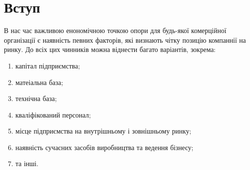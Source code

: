 




\fontsize{14}{14pt}\selectfont

\maketitle


\tableofcontents


%


\section{Вступ}
В нас час важливою енономічною точкою опори для будь-якої комерційної організації є наявність певних факторів, які визнають чітку позицію компаннії на ринку. До всіх цих чинників можна віднести багато варіантів, зокрема:
\begin{enumerate}
\item капітал підприємства;
\item матеіальна база;
\item технічна база;
\item кваліфікований персонал;
\item місце підприємства на внутрішньому і зовнішньому ринку;
\item наявність сучасних засобів виробництва та ведення бізнесу;
\item та інші.
\end{enumerate}

